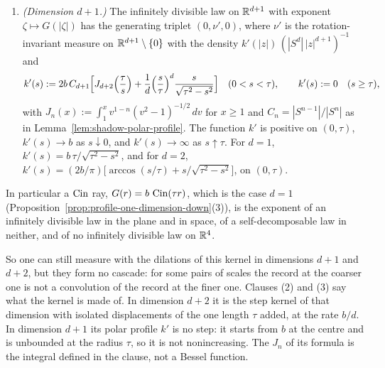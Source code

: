 \begin{proposition}
\begin{enumerate}
is the uniform probability measure on the sphere of radius $\tau$ of $\RR^{d+2}$: jumps at the
rate $b/d$, uniformly distributed on that sphere. Its generating triplet is
$(0,\ \nu^{\mathrm{step}}_{d+2} + \tfrac{b}{d}\,\sigma_\tau,\ 0)$, with $\nu^{\mathrm{step}}_{d+2}$
the \Levy{} measure of that step datum.
\item \emph{(Dimension $d + 1$.)} The infinitely divisible law on $\mathbb{R}^{d+1}$ with exponent
$\zeta \mapsto G(|\zeta|)$ has the generating triplet $(0, \nu', 0)$, where $\nu'$ is the
rotation-invariant measure on $\mathbb{R}^{d+1} \setminus \{0\}$ with the density
$k'(|z|)\,(|S^{d}|\,|z|^{d+1})^{-1}$ and
\[
  k'(s) := 2b\,C_{d+1}\Bigl[J_{d+2}\Bigl(\frac{\tau}{s}\Bigr)
     + \frac{1}{d}\Bigl(\frac{s}{\tau}\Bigr)^{d}\frac{s}{\sqrt{\tau^2 - s^2}}\Bigr]
  \quad (0 < s < \tau), \qquad k'(s) := 0 \quad (s \ge \tau) ,
\]
with $J_n(x) := \int_1^x v^{1-n}(v^2-1)^{-1/2}\,dv$ for $x \ge 1$ and $C_n = |S^{n-1}|/|S^{n}|$
as in Lemma~\ref{lem:shadow-polar-profile}. The function $k'$ is positive on $(0,\tau)$,
$k'(s) \to b$ as $s \downarrow 0$, and $k'(s) \to \infty$ as $s \uparrow \tau$. For $d = 1$,
$k'(s) = b\,\tau/\sqrt{\tau^2 - s^2}$, and for $d = 2$,
$k'(s) = (2b/\pi)\bigl[\arccos(s/\tau) + s/\sqrt{\tau^2 - s^2}\bigr]$, on $(0,\tau)$.
\end{enumerate}
In particular a $\operatorname{Cin}$ ray, $G(r) = b\,\operatorname{Cin}(\tau r)$, which is the case $d = 1$
(Proposition~\ref{prop:profile-one-dimension-down}(3)), is the exponent of an infinitely divisible law in the
plane and in space, of a self-decomposable law in neither, and of no infinitely divisible law on
$\mathbb{R}^4$.
\end{proposition}

So one can still measure with the dilations of this kernel in dimensions $d + 1$ and $d + 2$,
but they form no cascade: for some pairs of scales the record at the coarser one is not a
convolution of the record at the finer one. Clauses (2) and (3) say what the kernel is made of.
In dimension $d + 2$ it is the step kernel of that dimension with isolated displacements of the
one length $\tau$ added, at the rate $b/d$. In dimension $d + 1$ its polar profile $k'$ is no
step: it starts from $b$ at the centre and is unbounded at the radius $\tau$, so it is not
nonincreasing. The $J_n$ of its formula is the integral defined in the clause, not a Bessel
function.


